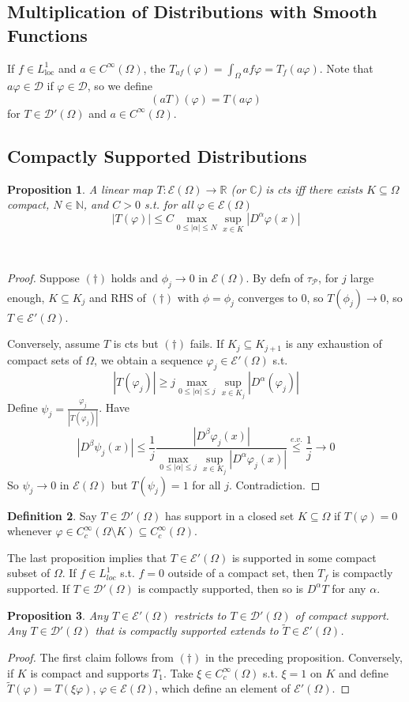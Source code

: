 \documentclass{article}
\theoremstyle{definition}
\newtheorem{defn}{Definition}[section]
\theoremstyle{remark}
\theoremstyle{plain}
\newtheorem{prop}[defn]{Proposition}
\newcommand{\NN}{\mathbb{N}}
\newcommand{\RR}{\mathbb{R}}
\newcommand{\CC}{\mathbb{C}}
\newcommand{\calD}{\mathcal{D}}
\begin{document}
\subsection{Multiplication of Distributions with Smooth Functions}
If $f\in L^1_{\text{loc}}$ and $a\in C^\infty(\Omega)$, the $T_{af}(\varphi)=\int_\Omega af\varphi=T_f(a\varphi)$. Note that $a\varphi\in\calD$ if $\varphi\in\calD$, so we define
\[(aT)(\varphi)=T(a\varphi)\]
for $T\in\calD'(\Omega)$ and $a\in C^\infty(\Omega)$.

\subsection{Compactly Supported Distributions}
\begin{prop}
    A linear map $T:\mathcal E(\Omega)\to\RR$ (or $\CC$) is cts iff there exists $K\subseteq\Omega$ compact, $N\in\NN$, and $C>0$ s.t. for all $\varphi\in\mathcal E(\Omega)$
    \[|T(\varphi)|\le C\max_{0\le|\alpha|\le N}\sup_{x\in K}|D^\alpha\varphi(x)|\tag{$\dagger$}\]
\end{prop}\
\begin{proof}
    Suppose $(\dagger)$ holds and $\phi_j\to 0$ in $\mathcal E(\Omega)$. By defn of $\tau_{\mathcal P}$, for $j$ large enough, $K\subseteq K_j$ and RHS of $(\dagger)$ with $\phi=\phi_j$ converges to $0$, so $T(\phi_j)\to 0$, so $T\in\mathcal E'(\Omega)$.

    Conversely, assume $T$ is cts but $(\dagger)$ fails. If $K_j\subseteq K_{j+1}$ is any exhaustion of compact sets of $\Omega$, we obtain a sequence $\varphi_j\in\mathcal E'(\Omega)$ s.t. \[|T(\varphi_j)|\ge j\max_{0\le |\alpha|\le j}\sup_{x\in K_j}|D^\alpha(\varphi_j)|\]
    Define $\psi_j=\frac{\varphi_j}{|T(\varphi_j)|}$. Have
    \[|D^\beta\psi_j(x)|\le\frac1j\frac{|D^\beta\varphi_j(x)|}{\max_{0\le|\alpha|\le j}\sup_{x\in K_j}|D^\alpha\varphi_j(x)|}\overset{e.v.}{\le}\frac1j\to 0\]
    So $\psi_j\to 0$ in $\mathcal E(\Omega)$ but $T(\psi_j)=1$ for all $j$. Contradiction.
\end{proof}
\begin{defn}
    Say $T\in \calD'(\Omega)$ has support in a closed set $K\subseteq \Omega$ if $T(\varphi)=0$ whenever $\varphi\in C^\infty_c(\Omega\setminus K)\subseteq C^\infty_c(\Omega)$.
\end{defn}
The last proposition implies that $T\in\mathcal E'(\Omega)$ is supported in some compact subset of $\Omega$.
If $f\in L^1_{loc}$ s.t. $f=0$ outside of a compact set, then $T_f$ is compactly supported. If $T\in\calD'(\Omega)$ is compactly supported, then so is $D^\alpha T$ for any $\alpha$.
\begin{prop}
    Any $T\in\mathcal E'(\Omega)$ restricts to $T\in\calD'(\Omega)$ of compact support. Any $T\in\calD'(\Omega)$ that is compactly supported extends to $\tilde T\in\mathcal E'(\Omega)$.
\end{prop}
\begin{proof}
    The first claim follows from $(\dagger)$ in the preceding proposition. Conversely, if $K$ is compact and supports $T_1$. Take $\xi\in C^\infty_c(\Omega)$ s.t. $\xi=1$ on $K$ and define $\tilde T(\varphi)=T(\xi\varphi)$, $\varphi\in\mathcal E(\Omega)$, which define an element of $\mathcal E'(\Omega)$.
\end{proof}
\end{document}

